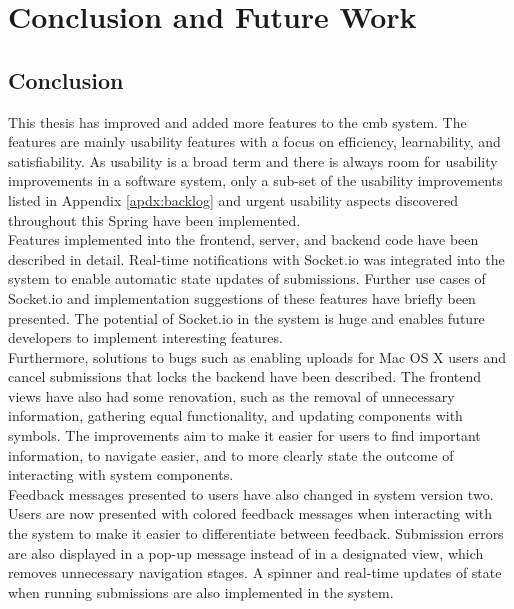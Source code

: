 \chapter{Conclusion and Future Work}
\label{ch:conclusion}

\section{Conclusion}
This thesis has improved and added more features to the \gls{cmb} system. The features are mainly usability features with a focus on efficiency, learnability, and satisfiability. As usability is a broad term and there is always room for usability improvements in a software system, only a sub-set of the usability improvements listed in Appendix \ref{apdx:backlog} and urgent usability aspects discovered throughout this Spring have been implemented. \\

Features implemented into the frontend, server, and backend code have been described in detail. Real-time notifications with Socket.io was integrated into the system to enable automatic state updates of submissions. Further use cases of Socket.io and implementation suggestions of these features have briefly been presented. The potential of Socket.io in the system is huge and enables future developers to implement interesting features. \\

Furthermore, solutions to bugs such as enabling uploads for Mac OS X users and cancel submissions that locks the backend have been described. The frontend views have also had some renovation, such as the removal of unnecessary information, gathering equal functionality, and updating components with symbols. The improvements aim to make it easier for users to find important information, to navigate easier, and to more clearly state the outcome of interacting with system components. \\

Feedback messages presented to users have also changed in system version two. Users are now presented with colored feedback messages when interacting with the system to make it easier to differentiate between feedback. Submission errors are also displayed in a pop-up message instead of in a designated view, which removes unnecessary navigation stages. A spinner and real-time updates of state when running submissions are also implemented in the system. \\

